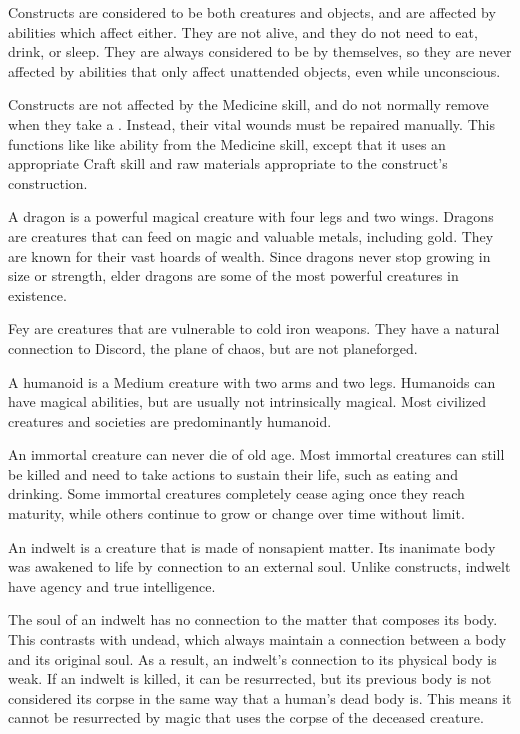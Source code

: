   Constructs are considered to be both creatures and objects, and are affected by abilities which affect either.
  They are not alive, and they do not need to eat, drink, or sleep.
  They are always considered to be  by themselves, so they are never affected by abilities that only affect unattended objects, even while unconscious.

  Constructs are not affected by the Medicine skill, and do not normally remove  when they take a .
  Instead, their vital wounds must be repaired manually.
  This functions like like  ability from the Medicine skill, except that it uses an appropriate Craft skill and raw materials appropriate to the construct's construction.

   A dragon is a powerful magical creature with four legs and two wings.
  Dragons are  creatures that can feed on magic and valuable metals, including gold. 
  They are known for their vast hoards of wealth.
  Since dragons never stop growing in size or strength, elder dragons are some of the most powerful creatures in existence.

  Fey are \magical creatures that are vulnerable to cold iron weapons.
  They have a natural connection to Discord, the plane of chaos, but are not planeforged.

  A humanoid is a Medium creature with two arms and two legs.
  Humanoids can have magical abilities, but are usually not intrinsically magical.
  Most civilized creatures and societies are predominantly humanoid.

  An immortal creature can never die of old age.
  Most immortal creatures can still be killed and need to take actions to sustain their life, such as eating and drinking.
  Some immortal creatures completely cease aging once they reach maturity, while others continue to grow or change over time without limit.

  An indwelt is a creature that is made of nonsapient matter.
  Its inanimate body was awakened to life by connection to an external soul.
  Unlike constructs, indwelt have agency and true intelligence.

  The soul of an indwelt has no connection to the matter that composes its body.
  This contrasts with undead, which always maintain a connection between a body and its original soul.
  As a result, an indwelt's connection to its physical body is weak.
  If an indwelt is killed, it can be resurrected, but its previous body is not considered its corpse in the same way that a human's dead body is.
  This means it cannot be resurrected by magic that uses the corpse of the deceased creature.

